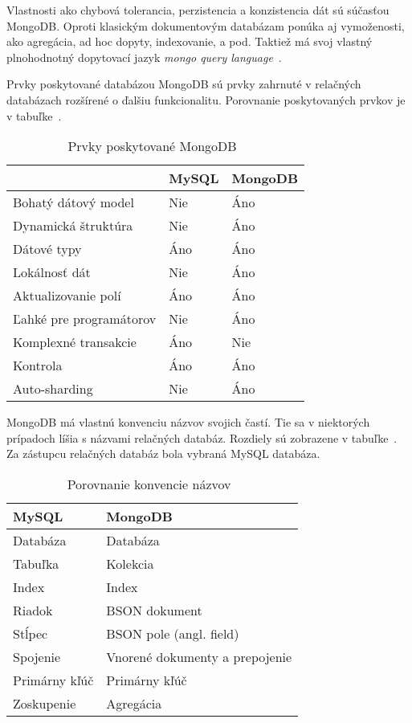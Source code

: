 Vlastnosti ako chybová tolerancia, perzistencia a konzistencia dát sú súčasťou MongoDB. Oproti klasickým dokumentovým databázam ponúka aj vymoženosti, ako agregácia, ad hoc dopyty, indexovanie, a pod. Taktiež má svoj vlastný plnohodnotný dopytovací jazyk \textit{mongo query language}~\cite{NoSQLDBvsRealtionDB}.

Prvky poskytované databázou MongoDB sú prvky zahrnuté v relačných databázach rozšírené o ďalšiu funkcionalitu. Porovnanie poskytovaných prvkov je v tabuľke~. 

\begin{table}[H]
	\centering
	\caption{Prvky poskytované MongoDB~\cite{MongoDBvsMySQLCompared}}
	\label{table:features_of_mongodb}
	\begin{tabular}{|l|l|l|}
		\hline
		& \textbf{MySQL} & \textbf{MongoDB} \\ \hline
		Bohatý dátový model & Nie & Áno \\ \hline
		Dynamická štruktúra & Nie & Áno \\ \hline
		Dátové typy & Áno & Áno \\ \hline
		Lokálnosť dát & Nie & Áno \\ \hline
		Aktualizovanie polí & Áno & Áno \\ \hline
		Ľahké pre programátorov & Nie & Áno \\ \hline
		Komplexné transakcie & Áno & Nie \\ \hline
		Kontrola & Áno & Áno \\ \hline
		Auto-sharding & Nie & Áno \\ \hline
	\end{tabular}
\end{table}

MongoDB má vlastnú konvenciu názvov svojich častí. Tie sa v niektorých prípadoch líšia s názvami relačných databáz. Rozdiely sú zobrazene v tabuľke~. Za zástupcu relačných databáz bola vybraná MySQL databáza. 

\begin{table}[H]
	\centering
	\caption{Porovnanie konvencie názvov~\cite{MongoDBvsMySQL2015}}
	\label{table:names_of_mongodb}
	\begin{tabular}{|l|l|}
		\hline
		\textbf{MySQL} & \textbf{MongoDB} \\ \hline
		Databáza & Databáza \\ \hline
		Tabuľka & Kolekcia \\ \hline
		Index & Index \\ \hline
		Riadok & BSON dokument \\ \hline
		Stĺpec & BSON pole (angl. field) \\ \hline
		Spojenie & Vnorené dokumenty a prepojenie \\ \hline
		Primárny kľúč & Primárny kľúč \\ \hline
		Zoskupenie & Agregácia \\ \hline
	\end{tabular}
\end{table}

